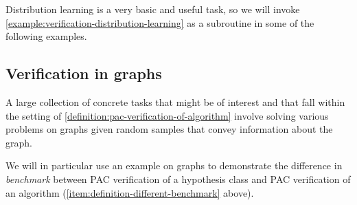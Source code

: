 \documentclass{toc}
\begin{document}
Distribution learning is a very basic and useful task, so we will invoke \cref{example:verification-distribution-learning} as a subroutine in some of the following examples.

%

%

%
%

%
%

\subsection{Verification in graphs}

A large collection of concrete tasks that might be of interest and that fall within the setting of \cref{definition:pac-verification-of-algorithm} involve solving various problems on graphs given random samples that convey information about the graph.

We will in particular use an example on graphs to demonstrate the difference in \emph{benchmark} between PAC verification of a hypothesis class and PAC verification of an algorithm (\cref{item:definition-different-benchmark} above).
\end{document}
